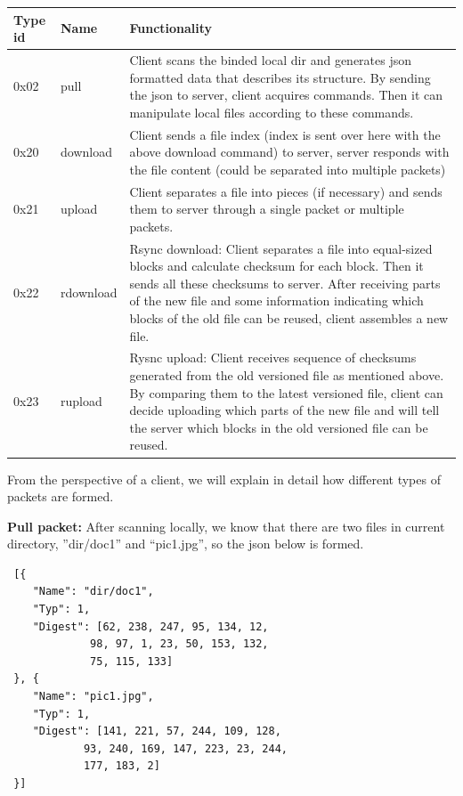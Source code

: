 \documentclass{article}
\begin{document}
 \begin{center}
 \begin{tabular}{ | m{2cm}  | m{2cm} | m{7cm} | }
 \hline
 \textbf{Type id} & \textbf{Name} & \textbf{Functionality} \\
 \hline
 0x02 & pull & Client scans the binded local dir and generates json formatted data that describes its structure. By sending the json to server, client acquires commands. Then it can manipulate local files according to these commands. \\
 \hline
 0x20 & download & Client sends a file index (index is sent over here with the above download command) to server, server responds with the file content (could be separated into multiple packets) \\
 \hline
 0x21 & upload & Client separates a file into pieces (if necessary) and sends them to server through a single packet or multiple packets. \\
 \hline
 0x22 & rdownload & Rsync download: Client separates a file into equal-sized blocks and calculate checksum for each block. Then it sends all these checksums to server. After receiving parts of the new file and some information indicating which blocks of the old file can be reused, client assembles a new file.
 \\
 \hline
 0x23 & rupload & Rysnc upload: Client receives sequence of checksums generated from the old versioned file as mentioned above. By comparing them to the latest versioned file, client can decide uploading which parts of the new file and will tell the server which blocks in the old versioned file can be reused. \\
 \hline
 \end{tabular}
 \end{center}

 From the perspective of a client, we will explain in detail how different types of packets are formed.
 \newline
 \hfill \break

\textbf{Pull packet:} After scanning locally, we know that there are two files in current directory, ”dir/doc1” and “pic1.jpg”, so the json below is formed.
 \begin{lstlisting}
 [{
 	"Name": "dir/doc1",
 	"Typ": 1,
 	"Digest": [62, 238, 247, 95, 134, 12,
             98, 97, 1, 23, 50, 153, 132,
             75, 115, 133]
 }, {
 	"Name": "pic1.jpg",
 	"Typ": 1,
 	"Digest": [141, 221, 57, 244, 109, 128,
            93, 240, 169, 147, 223, 23, 244,
            177, 183, 2]
 }]

 \end{lstlisting}
\end{document}
